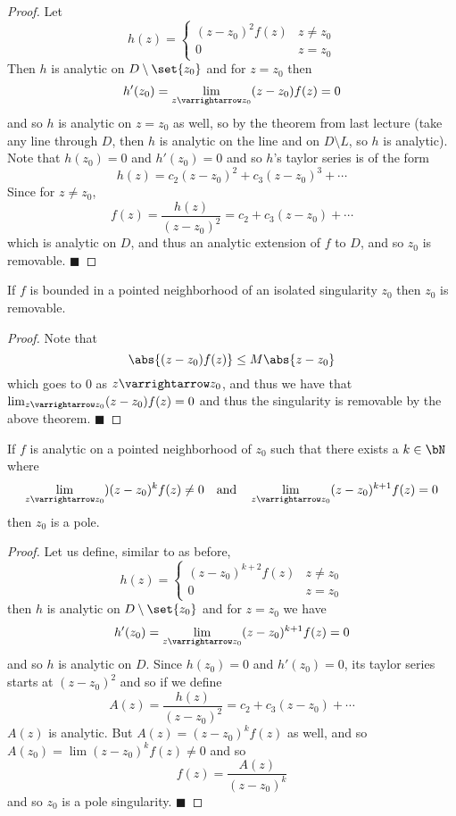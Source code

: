 \documentclass[10pt]{article}
\let\to=\varrightarrow
\def\qed{\hskip1cm\hbox{}\hfill$\blacksquare$}
\begin{document}
\begin{proof}

    Let
    \[ h(z) = \begin{cases} (z-z_0)^2f(z) & z\neq z_0 \\ 0 & z=z_0 \end{cases} \]
    Then $h$ is analytic on $D\setminus\set{z_0}$ and for $z=z_0$ then
    \[ h'(z_0) = \lim_{z\to z_0}(z-z_0)f(z) = 0 \]
    and so $h$ is analytic on $z=z_0$ as well, so by the theorem from last lecture (take any line through $D$, then $h$ is analytic on the line and on $D\setminus L$, so $h$ is analytic).
    Note that $h(z_0)=0$ and $h'(z_0)=0$ and so $h$'s taylor series is of the form
    \[ h(z) = c_2(z-z_0)^2 + c_3(z-z_0)^3 + \cdots \]
    Since for $z\neq z_0$,
    \[ f(z) = \frac{h(z)}{(z-z_0)^2} = c_2 + c_3(z-z_0) + \cdots \]
    which is analytic on $D$, and thus an analytic extension of $f$ to $D$, and so $z_0$ is removable.
    \qed

\end{proof}

\begin{coro*}

    If $f$ is bounded in a pointed neighborhood of an isolated singularity $z_0$ then $z_0$ is removable.

\end{coro*}

\begin{proof}

    Note that
    \[ \abs{(z-z_0)f(z)} \leq M\abs{z-z_0} \]
    which goes to $0$ as $z\to z_0$, and thus we have that $\lim_{z\to z_0}(z-z_0)f(z)=0$ and thus the singularity is removable by the above theorem.
    \qed

\end{proof}

\begin{thrm*}

    If $f$ is analytic on a pointed neighborhood of $z_0$ such that there exists a $k\in\bN$ where
    \[ \lim_{z\to z_0})(z-z_0)^k f(z) \neq 0\quad\text{and}\quad\lim_{z\to z_0}(z-z_0)^{k+1}f(z) = 0 \]
    then $z_0$ is a pole.

\end{thrm*}

\begin{proof}

    Let us define, similar to as before,
    \[ h(z) = \begin{cases}(z-z_0)^{k+2}f(z) & z\neq z_0 \\ 0 & z=z_0 \end{cases} \]
    then $h$ is analytic on $D\setminus\set{z_0}$ and for $z=z_0$ we have
    \[ h'(z_0) = \lim_{z\to z_0}(z-z_0)^{k+1}f(z) = 0 \]
    and so $h$ is analytic on $D$.
    Since $h(z_0)=0$ and $h'(z_0)=0$, its taylor series starts at $(z-z_0)^2$ and so if we define
    \[ A(z) = \frac{h(z)}{(z-z_0)^2} = c_2+c_3(z-z_0) + \cdots \]
    $A(z)$ is analytic.
    But $A(z)=(z-z_0)^kf(z)$ as well, and so $A(z_0)=\lim(z-z_0)^kf(z)\neq0$ and so
    \[ f(z) = \frac{A(z)}{(z-z_0)^k} \]
    and so $z_0$ is a pole singularity.
    \qed

\end{proof}
\end{document}
